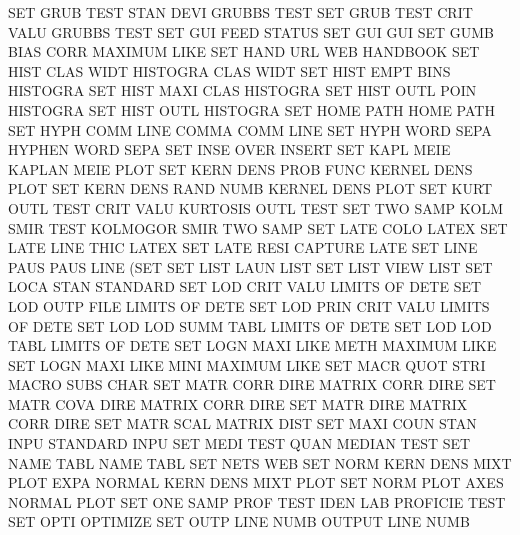 SET      GRUB TEST STAN DEVI            GRUBBS   TEST
SET      GRUB TEST CRIT VALU            GRUBBS   TEST
SET      GUI  FEED                      STATUS
SET      GUI                            GUI
SET      GUMB BIAS CORR                 MAXIMUM  LIKE
SET      HAND URL                       WEB      HANDBOOK
SET      HIST CLAS WIDT                 HISTOGRA CLAS WIDT
SET      HIST EMPT BINS                 HISTOGRA
SET      HIST MAXI CLAS                 HISTOGRA
SET      HIST OUTL POIN                 HISTOGRA
SET      HIST OUTL                      HISTOGRA
SET      HOME PATH                      HOME     PATH
SET      HYPH COMM LINE                 COMMA    COMM LINE
SET      HYPH WORD SEPA                 HYPHEN   WORD SEPA
SET      INSE OVER                      INSERT
SET      KAPL MEIE                      KAPLAN   MEIE PLOT
SET      KERN DENS PROB FUNC            KERNEL   DENS PLOT
SET      KERN DENS RAND NUMB            KERNEL   DENS PLOT
SET      KURT OUTL TEST CRIT VALU       KURTOSIS OUTL TEST
SET      TWO  SAMP KOLM SMIR TEST       KOLMOGOR SMIR TWO  SAMP
SET      LATE COLO                      LATEX
SET      LATE LINE THIC                 LATEX
SET      LATE RESI                      CAPTURE  LATE
SET      LINE PAUS                      PAUS     LINE (SET
SET      LIST LAUN                      LIST
SET      LIST VIEW                      LIST
SET      LOCA STAN                      STANDARD
SET      LOD      CRIT VALU             LIMITS   OF   DETE
SET      LOD      OUTP FILE             LIMITS   OF   DETE
SET      LOD      PRIN CRIT VALU        LIMITS   OF   DETE
SET      LOD      LOD  SUMM TABL        LIMITS   OF   DETE
SET      LOD      LOD  TABL             LIMITS   OF   DETE
SET      LOGN MAXI LIKE METH            MAXIMUM  LIKE
SET      LOGN MAXI LIKE MINI            MAXIMUM  LIKE
SET      MACR QUOT STRI                 MACRO    SUBS CHAR
SET      MATR CORR DIRE                 MATRIX   CORR DIRE
SET      MATR COVA DIRE                 MATRIX   CORR DIRE
SET      MATR DIRE                      MATRIX   CORR DIRE
SET      MATR SCAL                      MATRIX   DIST
SET      MAXI COUN STAN INPU            STANDARD INPU
SET      MEDI TEST QUAN                 MEDIAN   TEST
SET      NAME TABL                      NAME     TABL
SET      NETS                           WEB
SET      NORM KERN DENS MIXT PLOT EXPA  NORMAL   KERN DENS MIXT PLOT
SET      NORM PLOT AXES                 NORMAL   PLOT
SET      ONE  SAMP PROF TEST IDEN LAB   PROFICIE TEST
SET      OPTI                           OPTIMIZE
SET      OUTP LINE NUMB                 OUTPUT   LINE NUMB
